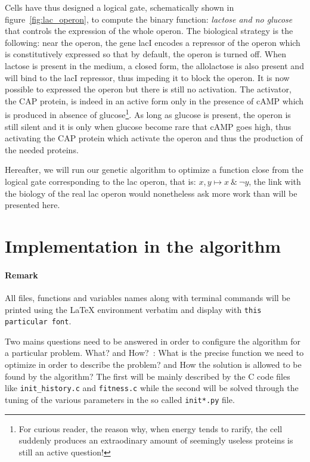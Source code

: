 \documentclass[]{article}
\begin{document}
Cells have thus designed a logical gate, schematically shown in
figure~\ref{fig:lac_operon}, to compute the binary function:
\emph{lactose and no glucose} that controls the expression of the whole operon.
The biological strategy is the following: near the operon, the gene lacI
encodes a repressor of the operon which is constitutively expressed so
that by default, the operon is turned off. When lactose is present in
the medium, a closed form, the allolactose is also present and will bind
to the lacI repressor, thus impeding it to block the operon. It is now
possible to expressed the operon but there is still no activation. The
activator, the CAP protein, is indeed in an active form only in the
presence of cAMP which is produced in absence of glucose\footnote{For curious
reader, the reason why, when energy tends to rarify, the cell suddenly produces
an extraodinary amount of seemingly useless proteins is still an active 
question!}. As long as
glucose is present, the operon is still silent and it is only when
glucose become rare that cAMP goes high, thus activating the CAP protein
which activate the operon and thus the production of the needed
proteins.

Hereafter, we will run our genetic algorithm to optimize a function close
from the logical gate corresponding to the lac operon, that is: $x,y \mapsto 
x~\&~\neg y$, the link with the biology of the real lac operon would
nonetheless ask more work than will be presented here.

\section{Implementation in the
algorithm}\label{implementation-in-the-algorithm}

\paragraph{Remark}
All files, functions and variables names along with terminal commands will
be printed using the \LaTeX{} environment verbatim and display
with \verb#this particular font#.

\vspace{1em}

Two mains questions need to be answered in order to configure the
algorithm for a particular problem. What? and How?~: What is the
precise function we need to optimize in order to describe the problem?
and How the solution is allowed to be found by the algorithm? The first
will be mainly described by the C code files like \verb#init_history.c# and
\verb#fitness.c# while the second will be solved through the tuning of the
various parameters in the so called \verb#init*.py# file.
\end{document}
